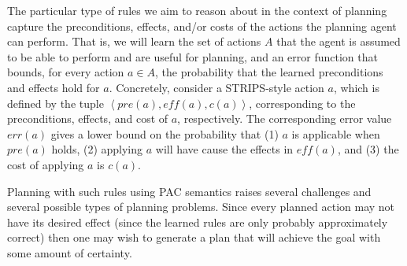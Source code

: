 \documentclass[12pt]{article}
\newcommand{\note}[1]{\textbf{\textit{#1}}}
\newcommand{\tuple}[1]{\ensuremath{\left \langle #1 \right \rangle }}
\newcommand{\eff}{\textit{eff}}
\newcommand{\pre}{\textit{pre}}
\begin{document}
The particular type of rules we aim to reason about in the context of planning capture the preconditions, effects, and/or costs of the actions the planning agent can perform. 
That is, we will learn the set of actions $A$ that the agent is assumed to be able to perform and are useful for planning, 
and an error function that bounds, for every action $a\in A$, 
the probability that the learned preconditions and effects hold for $a$.
Concretely, consider a STRIPS-style action $a$, which is defined by the tuple $\tuple{\pre(a), \eff(a), c(a)}$, corresponding to the preconditions, effects, and cost of $a$, respectively. The corresponding error value $err(a)$ gives a lower bound on the probability that (1) $a$ is applicable when $\pre(a)$ holds, (2) applying $a$ will have cause the effects in $\eff(a)$, and (3) the cost of applying $a$ is $c(a)$. 







Planning with such rules using PAC semantics raises several challenges and several possible types of planning problems.
Since every planned action may not have its desired effect (since the learned rules are only probably approximately correct)
then one may wish to generate a plan that will achieve the goal with some amount of certainty. 
\end{document}
